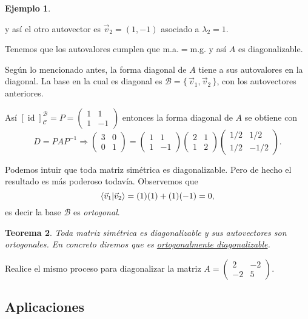 \documentclass[12pt]{article}
\theoremstyle{plain}
\newtheorem{Th}{Teorema}  %
\theoremstyle{definition}
\newtheorem{Ex}[Th]{Ejemplo}           %
\theoremstyle{remark}
\DeclareMathOperator{\id}{id}       %
\newcommand{\la}{\lambda}           %
\newcommand{\cB}{\mathcal{B}}       %
\newcommand{\cC}{\mathcal{C}}       %
\renewcommand{\:}{\colon}           %
\newcommand{\un}[1]{\underline{#1}}
\renewcommand{\.}{\Cdot}                %
\newcommand{\twobytwo}[4]{\begin{pmatrix} %
    #1 & #2 \\ #3 & #4 \end{pmatrix}}
\newcommand{\To}{\Rightarrow}
\newcommand{\set}[1]{\{\,#1\,\}}    %
\begin{document}
\begin{multicols}{2}
\begin{Ex}
\begin{enumerate}
    y así el otro autovector es $\vec{v}_2=(1,-1)$ asociado a $\la_2=1$.
  \end{enumerate}
  Tenemos que los autovalores cumplen que m.a.$=$m.g. y así $A$ es diagonalizable.\par 
  Según lo mencionado antes, la forma diagonal de $A$ tiene a sus autovalores en la diagonal. La base en la cual es diagonal es $\cB=\set{\vec{v}_1,\vec{v}_2}$, con los autovectores anteriores.\par 
  Así $[\id]^\cB_\cC=P=\twobytwo{1}{1}{1}{-1}$ entonces la forma diagonal de $A$ se obtiene con 
  $$D=PAP^{-1}\To\twobytwo{3}{0}{0}{1}=\twobytwo{1}{1}{1}{-1}\twobytwo{2}{1}{1}{2}\twobytwo{1/2}{1/2}{1/2}{-1/2}.$$
\end{Ex}

Podemos intuir que toda matriz simétrica es diagonalizable. Pero de hecho el resultado es más poderoso todavía. Observemos que 
$$\braket{\vec{v}_1}{\vec{v}_2}=(1)(1)+(1)(-1)=0,$$
es decir la base $\cB$ es \emph{ortogonal}.

\begin{Th}
  Toda matriz simétrica es diagonalizable y sus autovectores son ortogonales. En concreto diremos que es \un{ortogonalmente diagonalizable}.
\end{Th}
\begin{ptcbP}
Realice el mismo proceso para diagonalizar la matriz $A=\twobytwo{2}{-2}{-2}{5}$.
\iffalse
\begin{enumerate}
  \itemsep=-0.5em 
  \item Encuentre los autovalores de $A$.
  \item Calcule los espacios invariantes respectivos.
  \item Realice la multiplicación de matrices para corroborar.
\end{enumerate}
\fi
\end{ptcbP}
\newpage
\subsection*{Aplicaciones}


\end{multicols}
\end{document}
